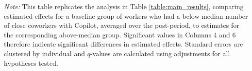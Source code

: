 \documentclass{article}
\newenvironment{tablenotes}{
    \begin{flushleft} \small
    \textit{Note:} 
}{
    \end{flushleft}
}
\begin{document}
\begin{table}[htbp]
    \caption{Effects of Copilot - Split by Coworkers with Copilot}
    \label{table:split_results_teammates}    
    \begin{tablenotes} This table replicates the analysis in Table \ref{table:main_results}, comparing estimated effects for a baseline group of workers who had a below-median number of close coworkers with Copilot, averaged over the post-period, to estimates for the corresponding above-median group. Significant values in Columns 4 and 6 therefore indicate significant differences in estimated effects. Standard errors are clustered by individual and $q$-values are calculated using adjustments for all hypotheses tested. 
    \end{tablenotes}
\end{table}
\end{document}

